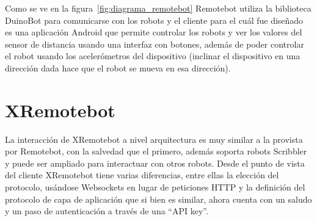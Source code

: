 Como se ve en la figura~\ref{fig:diagrama_remotebot} Remotebot utiliza la
biblioteca DuinoBot para comunicarse con los robots y el cliente para el cuál
fue diseñado es una aplicación Android que permite controlar los robots
y ver los valores del sensor de distancia usando una interfaz con botones,
además de poder controlar el robot usando los acelerómetros del dispositivo
(inclinar el dispositivo en una dirección dada hace que el robot se mueva
en esa dirección).

\section{XRemotebot}\label{ch2:xremotebot}

La interacción de XRemotebot a nivel arquitectura es muy similar a la provista por Remotebot,
con la salvedad que el primero, además soporta robots Scribbler y puede ser
ampliado para interactuar con otros robots. Desde el punto de vista del cliente
XRemotebot tiene varias diferencias, entre ellas la elección del protocolo,
usándose Websockets en lugar de peticiones HTTP y la definición del protocolo
de capa de aplicación que si bien es similar, ahora cuenta con un saludo y
un paso de autenticación a través de una ``API key''.




